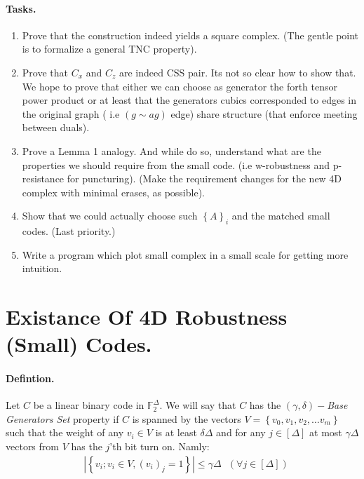 \documentclass{article}
\begin{document}
\begin{multicols*}{2}
\paragraph{Tasks.}
	\begin{enumerate}
	  \item Prove that the construction indeed yields a square complex. (The gentle point is to formalize a general TNC property).  
	  \item Prove that $C_{x}$ and $C_{z}$ are indeed CSS pair. Its not so clear how to show that. We hope to prove that either we can choose as generator the forth tensor power product or at least that the generators cubics corresponded to edges in the original graph ( i.e $ \left( g \sim ag  \right) $ edge) share structure (that enforce meeting between duals).
	  \item Prove a Lemma 1 analogy. And while do so, understand what are the properties we should require from the small code.  
	    (i.e w-robustness and p-resistance for puncturing). 
	    (Make the requirement changes for the new 4D complex with minimal erases, as possible).
	  \item Show that we could actually choose such $\left\{ A \right\}_{i}$ and the matched small codes. (Last priority.) 
	  \item Write a program which plot small complex in a small scale for getting more intuition.  
	\end{enumerate}
	\section{Existance Of 4D Robustness (Small) Codes.} 
	\paragraph{Defintion.} Let $C$ be a linear binary code in $\mathbb{F}^{\Delta}_{2}$. We will say that $C$ has the $\left( \gamma,\delta \right)-$\textit{Base Generators Set} property if $C$ is spanned by the vectors $V = \left\{v_{0},v_{1},v_{2},\dots v_{m}  \right\} $ such that the weight of any $v_{i}\in V$ is at least $\delta\Delta$ and for any $j \in [\Delta]$ at most $\gamma\Delta$ vectors from $V$ has the $j$'th bit turn on. Namly:
	\begin{equation*}
	  \begin{split}
	    & | \left\{ v_{i}; v_{i}\in V , \left( v_{i} \right)_{j} = 1  \right\} | \le \gamma\Delta \ \ \ \left( \forall j \in \left[ \Delta \right] \right)
	  \end{split}
	\end{equation*}

\end{multicols*}
\end{document}
